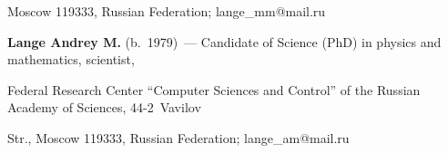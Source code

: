 Moscow 119333, Russian Federation; \mbox{lange\_mm@mail.ru}





\vspace*{3pt}





\noindent


\textbf{Lange Andrey M.} (b.\ 1979)~--- Candidate of Science (PhD) in physics and mathematics, scientist, 


Federal Research Center ``Computer Sciences and Control'' of the Russian Academy of Sciences, 44-2~Vavilov 


Str., Moscow 119333, Russian Federation; \mbox{lange\_am@mail.ru}

















\label{end\stat}





\renewcommand{\bibname}{\protect\rm Литература} 


